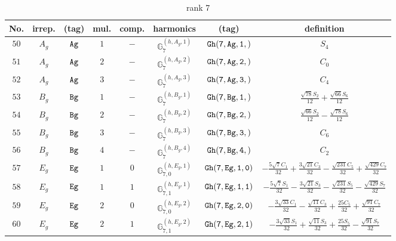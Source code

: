 \documentclass[fleqn,8pt]{jsarticle}
\begin{document}
\begin{table}[ht!]
\begin{center}
\caption{rank 7}
\renewcommand{\arraystretch}{1.3}
\begin{tabular}{cccccccc} \hline \hline
No. & irrep. & (tag) & mul. & comp. & harmonics & (tag) & definition \\ \hline
$ 50 $ & $ A_{g} $ & $ {\tt Ag} $ & $ 1 $ & $ - $ & $ \mathbb{G}_{7}^{(h,A_{g},1)} $ & $ {\tt Gh(7,Ag,1,)} $ & $ S_{4} $ \\
$ 51 $ & $ A_{g} $ & $ {\tt Ag} $ & $ 2 $ & $ - $ & $ \mathbb{G}_{7}^{(h,A_{g},2)} $ & $ {\tt Gh(7,Ag,2,)} $ & $ C_{0} $ \\
$ 52 $ & $ A_{g} $ & $ {\tt Ag} $ & $ 3 $ & $ - $ & $ \mathbb{G}_{7}^{(h,A_{g},3)} $ & $ {\tt Gh(7,Ag,3,)} $ & $ C_{4} $ \\
$ 53 $ & $ B_{g} $ & $ {\tt Bg} $ & $ 1 $ & $ - $ & $ \mathbb{G}_{7}^{(h,B_{g},1)} $ & $ {\tt Gh(7,Bg,1,)} $ & $ \frac{\sqrt{78} S_{2}}{12} + \frac{\sqrt{66} S_{6}}{12} $ \\
$ 54 $ & $ B_{g} $ & $ {\tt Bg} $ & $ 2 $ & $ - $ & $ \mathbb{G}_{7}^{(h,B_{g},2)} $ & $ {\tt Gh(7,Bg,2,)} $ & $ \frac{\sqrt{66} S_{2}}{12} - \frac{\sqrt{78} S_{6}}{12} $ \\
$ 55 $ & $ B_{g} $ & $ {\tt Bg} $ & $ 3 $ & $ - $ & $ \mathbb{G}_{7}^{(h,B_{g},3)} $ & $ {\tt Gh(7,Bg,3,)} $ & $ C_{6} $ \\
$ 56 $ & $ B_{g} $ & $ {\tt Bg} $ & $ 4 $ & $ - $ & $ \mathbb{G}_{7}^{(h,B_{g},4)} $ & $ {\tt Gh(7,Bg,4,)} $ & $ C_{2} $ \\
$ 57 $ & $ E_{g} $ & $ {\tt Eg} $ & $ 1 $ & $ 0 $ & $ \mathbb{G}_{7,0}^{(h,E_{g},1)} $ & $ {\tt Gh(7,Eg,1,0)} $ & $ - \frac{5 \sqrt{7} C_{1}}{32} + \frac{3 \sqrt{21} C_{3}}{32} - \frac{\sqrt{231} C_{5}}{32} + \frac{\sqrt{429} C_{7}}{32} $ \\
$ 58 $ & $ E_{g} $ & $ {\tt Eg} $ & $ 1 $ & $ 1 $ & $ \mathbb{G}_{7,1}^{(h,E_{g},1)} $ & $ {\tt Gh(7,Eg,1,1)} $ & $ - \frac{5 \sqrt{7} S_{1}}{32} - \frac{3 \sqrt{21} S_{3}}{32} - \frac{\sqrt{231} S_{5}}{32} - \frac{\sqrt{429} S_{7}}{32} $ \\
$ 59 $ & $ E_{g} $ & $ {\tt Eg} $ & $ 2 $ & $ 0 $ & $ \mathbb{G}_{7,0}^{(h,E_{g},2)} $ & $ {\tt Gh(7,Eg,2,0)} $ & $ - \frac{3 \sqrt{33} C_{1}}{32} - \frac{\sqrt{11} C_{3}}{32} + \frac{25 C_{5}}{32} + \frac{\sqrt{91} C_{7}}{32} $ \\
$ 60 $ & $ E_{g} $ & $ {\tt Eg} $ & $ 2 $ & $ 1 $ & $ \mathbb{G}_{7,1}^{(h,E_{g},2)} $ & $ {\tt Gh(7,Eg,2,1)} $ & $ - \frac{3 \sqrt{33} S_{1}}{32} + \frac{\sqrt{11} S_{3}}{32} + \frac{25 S_{5}}{32} - \frac{\sqrt{91} S_{7}}{32} $ \\

\end{tabular}
\end{center}
\end{table}
\end{document}
